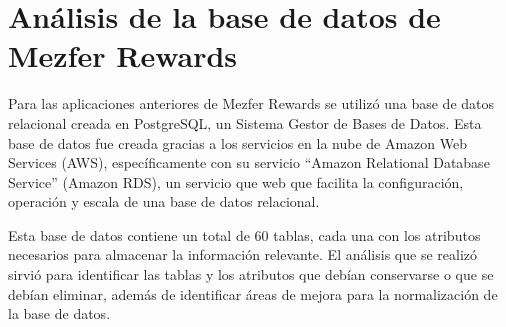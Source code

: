 \section{Análisis de la base de datos de Mezfer Rewards}
Para las aplicaciones anteriores de Mezfer Rewards se utilizó una base de datos relacional creada en PostgreSQL, un Sistema Gestor de Bases de Datos. Esta base de datos fue creada gracias a los servicios en la nube de Amazon Web Services (AWS), específicamente con su servicio ``Amazon Relational Database Service'' (Amazon RDS), un servicio que web que facilita la configuración, operación y escala de una base de datos relacional.

Esta base de datos contiene un total de 60 tablas, cada una con los atributos necesarios para almacenar la información relevante. El análisis que se realizó sirvió para identificar las tablas y los atributos que debían conservarse o que se debían eliminar, además de identificar áreas de mejora para la normalización de la base de datos.
    